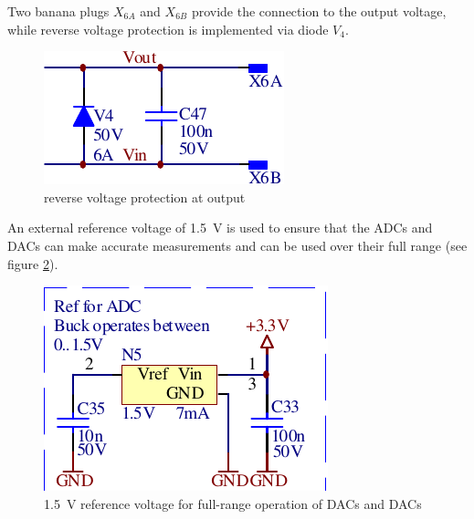 Two banana  plugs $X_{6A}$ and $X_{6B}$  provide the connection to  the output
voltage, while reverse voltage protection is implemented via diode $V_4$.


\begin{figure}[th!]
    \center
    \includegraphics[width=.35\textwidth]{images/circuit/output-connectors.pdf}
    \caption{reverse voltage protection at output}
    \label{fig:circuit:output}
\end{figure}

An external  reference voltage of \SI{1.5}{\volt}  is used to ensure  that the
ADCs and DACs can  make accurate measurements and can be  used over their full
range (see figure \ref{fig:circuit:vref}).

\begin{figure}[th!]
    \center
    \includegraphics[width=.4\textwidth]{images/circuit/vref.pdf}
    \caption{%
        \SI{1.5}{\volt} reference voltage for full-range operation of DACs and
        DACs
    }
    \label{fig:circuit:vref}
\end{figure}
